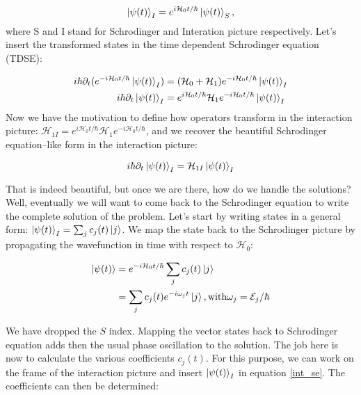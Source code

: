 \begin{equation}
    \ket{\psi(t)}_{I} = e^{i\mathcal{H}_{0}t/ \hbar} \ket{\psi(t)}_{S},
\end{equation}
where S and I stand for Schrodinger and Interation picture respectively. Let's insert the transformed states in the time dependent Schrodinger equation (TDSE):

\begin{equation}
    \begin{aligned}
    i \hbar \partial_{t} (e^{-i\mathcal{H}_{0}t/ \hbar} \ket{\psi(t)}_{I}) & = (\mathcal{H}_{0} + \mathcal{H}_{1}) e^{-i\mathcal{H}_{0}t/ \hbar} \ket{\psi(t)}_{I} \\
    i \hbar \partial_{t} \ket{\psi(t)}_{I} & = e^{i\mathcal{H}_{0}t/ \hbar} \mathcal{H}_{1} e^{-i\mathcal{H}_{0}t/ \hbar} \ket{\psi(t)}_{I}
    \end{aligned}
\end{equation}
Now we have the motivation to define how operators transform in the interaction picture: $\mathcal{H}_{1I} = e^{i\mathcal{H}_{0}t/ \hbar} \mathcal{H}_{1} e^{-i\mathcal{H}_{0}t/ \hbar}$, and we recover the beautiful Schrodinger equation--like form in the interaction picture:

\begin{equation} \label{int_se}
    i \hbar \partial_{t} \ket{\psi(t)}_{I} = \mathcal{H}_{1I}  \ket{\psi(t)}_{I}
\end{equation}

That is indeed beautiful, but once we are there, how do we handle the solutions? Well, eventually we will want to come back to the Schrodinger equation to write the complete solution of the problem. Let's start by writing states in a general form: $\ket{\psi(t)}_{I} = \sum _{j} c_{j}(t) \ket{j}$. We map the state back to the Schrodinger picture by propagating the wavefunction in time with respect to $\mathcal{H}_{0}$:

\begin{equation}
    \begin{aligned}
        \ket{\psi(t)} & = e^{-i \mathcal{H}_{0}t / \hbar} \sum _{j} c_{j}(t) \ket{j} \\
            & = \sum _{j} c_{j}(t) e^{-i \omega_{j} t} \ket{j}, \mathrm{with} \omega_{j} = \mathcal{E}_{j} / \hbar
    \end{aligned}
\end{equation}

We have dropped the $S$ index. Mapping the vector states back to Schrodinger equation adds then the usual phase oscillation to the solution. The job here is now to calculate the various coefficients $c_{j}(t)$. For this purpose, we can work on the frame of the interaction picture and insert $\ket{\psi(t)}_{I}$ in equation \ref{int_se}. The coefficients can then be determined:

